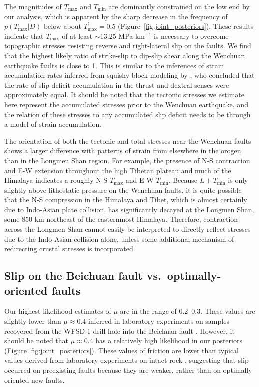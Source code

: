 \documentclass[draft,jgrga]{AGUTeX}
\begin{document}
\begin{article}
The magnitudes of $T_{\mathrm{max}}$ and $T_{\mathrm{min}}$ are
dominantly constrained on the low end by our analysis, which is apparent
by the sharp decrease in the frequency of $p(T_{\mathrm{max}}|D)$ below
about $T^\prime_{\mathrm{max}} = 0.5$ (Figure~\ref{fig:joint_posteriors}). 
These results indicate that $T_{\mathrm{max}}$ of at
least $\sim$13.25 MPa km$^{-1}$ is necessary to overcome
topographic stresses resisting reverse and right-lateral slip on the
faults. We find that the highest likely ratio of strike-slip to dip-slip
shear along the Wenchuan earthquake faults is close to 1. This is
similar to the inferences of strain accumulation rates inferred from
squishy block modeling by \citet{loveless2011}, who
concluded that the rate of slip deficit accumulation in the thrust and
dextral senses were approximately equal. It should be noted that the
tectonic stresses we estimate here represent the accumulated stresses
prior to the Wenchuan earthquake, and the relation of these stresses to any
accumulated slip deficit needs to be through a model of strain
accumulation.

The orientation of both the tectonic and total stresses near the
Wenchuan faults shows a larger difference with patterns of strain from
elsewhere in the orogen than in the Longmen Shan region. For example, the
presence of N-S contraction and E-W extension throughout the high Tibetan
plateau and much of the Himalaya \citep[e.g.,][]{armijo1986, molnar1988,
taylor2003} indicates a roughly N-S $T_{\mathrm{max}}$ and E-W
$T_{\mathrm{min}}$. Because $ L + T_{\mathrm{min}}$ is only slightly above
lithostatic pressure on the Wenchuan faults, it is quite possible that the N-S
compression in the Himalaya and Tibet, which is almost certainly due to
Indo-Asian plate collision, has significantly decayed at the Longmen Shan, some
850 km northeast of the easternmost Himalaya. Therefore, contraction across the
Longmen Shan cannot easily be interpreted to directly reflect stresses due to
the Indo-Asian collision alone, unless some additional mechanism of redirecting
crustal stresses is incorporated.

\subsection{Slip on the Beichuan fault vs.~optimally-oriented
faults}\label{slip-on-the-beichuan-fault-vs.optimally-oriented-faults}

Our highest likelihood estimates of $\mu$ are in the range of 0.2--0.3.
These values are slightly lower than $\mu \approx 0.4$ inferred in
laboratory experiments on samples recovered from the WFSD-1 drill hole
into the Beichuan fault \citep{kuo2014}. However, it should be noted that
$\mu \approx 0.4$ has a relatively high likelihood in our posteriors
(Figure \ref{fig:joint_posteriors}). These values of friction 
are lower than typical values derived from laboratory experiments on
intact rock \citep[e.g.,][]{byerlee1978}, suggesting that slip occurred on
preexisting faults because they are weaker, rather than on optimally oriented
new faults.


\end{article}
\end{document}

